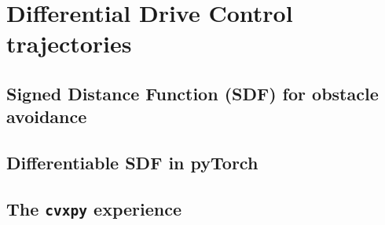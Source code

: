 \documentclass[twoside,11pt]{article}
\begin{document}
\section{Differential Drive Control trajectories}

\subsection{Signed Distance Function (SDF) for obstacle avoidance}

\subsection{Differentiable SDF in pyTorch}

\subsection{The \texttt{cvxpy} experience}


\end{document}
